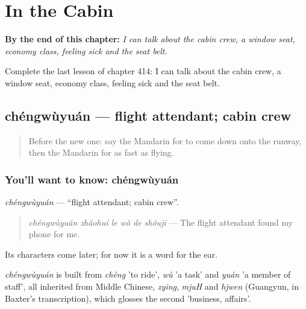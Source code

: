 
\chapter{In the Cabin}
\label{ch:zh-in-the-cabin}

\begin{chapteropening}
\textbf{By the end of this chapter:} \emph{I can talk about the cabin crew, a window seat, economy class, feeling sick and the seat belt.}

Complete the last lesson of chapter 414: I can talk about the cabin crew, a window seat, economy class, feeling sick and the seat belt.
\end{chapteropening}

\section[chéngwùyuán]{chéngwùyuán — flight attendant; cabin crew}

\label{lesson:ZH-C414-chengwuyuan}



\begin{quote}
Before the new one: say the Mandarin for to come down onto the runway, then the Mandarin for as fast as flying.
\end{quote}

\subsection*{You'll want to know: chéngwùyuán}
\emph{chéngwùyuán} — \textquotedblleft{}flight attendant; cabin crew\textquotedblright{}.

\begin{quote}
\emph{chéngwùyuán zhǎohuí le wǒ de shǒujī} — The flight attendant found my phone for me.
\end{quote}

Its characters come later; for now it is a word for the ear.

\begin{cousinweb}
\emph{chéngwùyuán} is built from \emph{chéng} 'to ride', \emph{wù} 'a task' and \emph{yuán} 'a member of staff', all inherited from Middle Chinese, \emph{zying}, \emph{mjuH} and \emph{hjwen} (Guangyun, in Baxter's transcription), which glosses the second 'business, affairs'.
\end{cousinweb}

